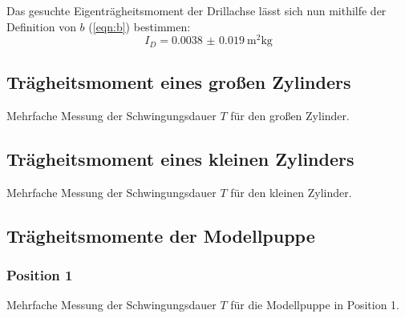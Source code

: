 Das gesuchte Eigenträgheitsmoment der Drillachse lässt sich nun mithilfe der Definition von $b$ (\autoref{eqn:b}) bestimmen:
\begin{equation*}
    I_D = \SI{0.0038(190)}{\metre^2\kg}
\end{equation*}

\FloatBarrier

\subsection{Trägheitsmoment eines großen Zylinders}
\begin{table}
    \centering
    \caption{Mehrfache Messung der Schwingungsdauer $T$ für den großen Zylinder.}
    \label{tab:zylinder_gr}  
\end{table}
\FloatBarrier

\subsection{Trägheitsmoment eines kleinen Zylinders}
\begin{table}
    \centering
    \caption{Mehrfache Messung der Schwingungsdauer $T$ für den kleinen Zylinder.}
    \label{tab:zylinder_kl}  
\end{table}
\FloatBarrier

\subsection{Trägheitsmomente der Modellpuppe}
\subsubsection{Position 1}
\begin{table}
    \centering
    \caption{Mehrfache Messung der Schwingungsdauer $T$ für die Modellpuppe in Position 1.}
    \label{tab:modellpuppe1}  
\end{table}
\FloatBarrier

